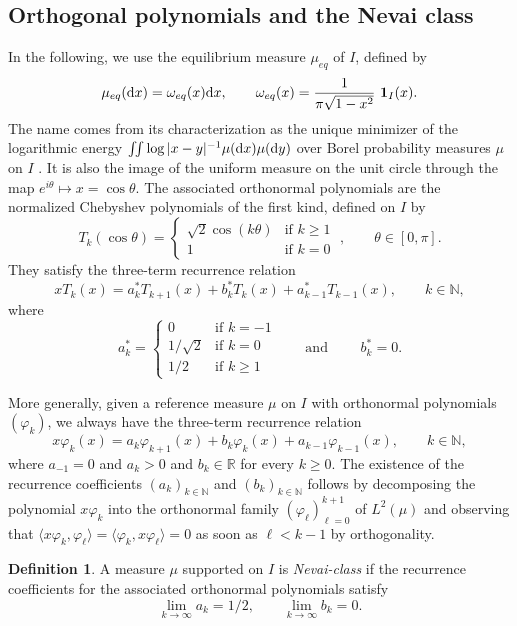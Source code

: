 \documentclass[a4paper,11pt]{article}
\numberwithin{equation}{section}
\theoremstyle{definition}
\newtheorem{definition}[]{Definition}
\newcommand{\eq}{\begin{equation}}
\newcommand{\qe}{\end{equation}}
\newcommand{\N}{\mathbb{N}}
\newcommand{\R}{\mathbb{R}}
\newcommand{\bs}{\boldsymbol}
\renewcommand{\geq}{\geqslant}
\renewcommand{\phi}{\varphi}
\renewcommand{\d}{ {\rm d}}
\begin{document}
\subsection{Orthogonal polynomials and the Nevai class}
\label{background sec}
In the following, we use the equilibrium measure $\mu_{eq}$ of $I$, defined by
\eq
\label{mueq}
\mu_{eq}(\d x)=\omega_{eq}(x)\d x,\qquad \omega_{eq}(x)=\frac{1}{\pi\sqrt{1-x^2}}\ \bs 1_{I}(x).
\qe
The name comes from its characterization as the unique minimizer of the logarithmic energy $\iint
\log|x-y|^{-1}\mu(\d x)\mu(\d y)$ over Borel probability measures $\mu$ on $I$ \citep{SaTo97}. It is also the image of the uniform measure on the unit circle through the map $e^{i\theta}\mapsto x=\cos\theta$. The associated orthonormal polynomials are the normalized Chebyshev polynomials of the first kind, defined on $I$ by
\eq
\label{Cheby cos}
T_k(\cos\theta)=
\begin{cases}
\sqrt 2 \cos(k\theta) & \mbox{if }k\geq 1\\
1 & \mbox{if }k=0
\end{cases}\;,\qquad \theta \in [0,\pi].
\qe
They satisfy the three-term recurrence relation
\eq
\label{Cheby 3-rec}
x T_k(x)= a_k^* T_{k+1}(x) + b_k^* T_k(x) + a_{k-1}^*T_{k-1}(x),\qquad k\in\N,
\qe
where
\eq
\label{rec coef Cheby}
a_k^*=
\begin{cases}
0 & \mbox{if } k=-1\\
1/\sqrt 2& \mbox{if } k=0\\
1/2 & \mbox{if } k\geq 1
\end{cases}
\qquad \mbox{and }\qquad b_k^*=0.
\qe

More generally, given a reference measure $\mu$ on $I$ with orthonormal polynomials $(\phi_k)$, we always have the three-term recurrence relation
\eq
\label{3-term rec}
x\phi_k(x)=a_{k}\phi_{k+1}(x)+b_k\phi_k(x)+a_{k-1}\phi_{k-1}(x),\qquad k\in\N,
\qe
where $a_{-1}=0$ and  $a_k>0$ and $b_k\in\R$ for every $k\geq 0$. The existence of the recurrence coefficients $(a_k)_{k\in\N}$ and $(b_k)_{k\in \N}$ follows by decomposing the polynomial $x\phi_k$ into the orthonormal family $(\phi_\ell)_{\ell=0}^{k+1}$ of $L^2(\mu)$ and  observing that $\langle x\phi_k,\phi_\ell\rangle=\langle \phi_k,x\phi_\ell\rangle=0$ as soon as $\ell<k-1$ by  orthogonality.

\begin{definition}
\label{def Nevai class}
A measure $\mu$ supported on $I$ is \emph{Nevai-class} if the  recurrence coefficients for the associated orthonormal polynomials satisfy
\[
\lim_{k\rightarrow\infty}a_k=1/2,\qquad \lim_{k\rightarrow\infty}b_k=0.
\]
\end{definition}
\end{document}
